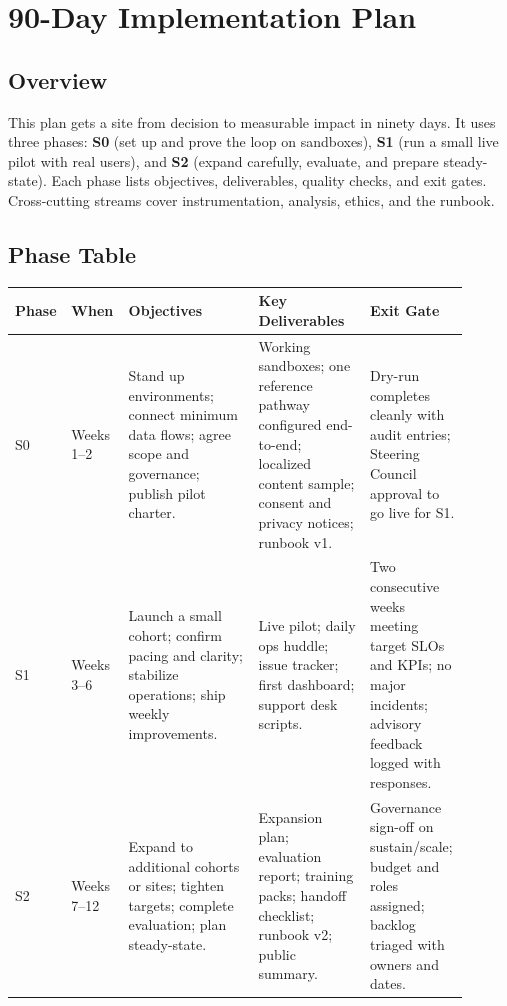 \documentclass[12pt]{article}
\begin{document}
\section{90-Day Implementation Plan}

\subsection*{Overview}
This plan gets a site from decision to measurable impact in ninety days. It uses three phases: \textbf{S0} (set up and prove the loop on sandboxes), \textbf{S1} (run a small live pilot with real users), and \textbf{S2} (expand carefully, evaluate, and prepare steady-state). Each phase lists objectives, deliverables, quality checks, and exit gates. Cross-cutting streams cover instrumentation, analysis, ethics, and the runbook.

\subsection*{Phase Table}
\begin{longtable}{@{}p{0.08\linewidth}p{0.12\linewidth}p{0.28\linewidth}p{0.24\linewidth}p{0.18\linewidth}@{}}
\toprule
\textbf{Phase} & \textbf{When} & \textbf{Objectives} & \textbf{Key Deliverables} & \textbf{Exit Gate} \\
\midrule
\endhead
S0 & Weeks 1--2 & Stand up environments; connect minimum data flows; agree scope and governance; publish pilot charter. & Working sandboxes; one reference pathway configured end-to-end; localized content sample; consent and privacy notices; runbook v1. & Dry-run completes cleanly with audit entries; Steering Council approval to go live for S1. \\
S1 & Weeks 3--6 & Launch a small cohort; confirm pacing and clarity; stabilize operations; ship weekly improvements. & Live pilot; daily ops huddle; issue tracker; first dashboard; support desk scripts. & Two consecutive weeks meeting target SLOs and KPIs; no major incidents; advisory feedback logged with responses. \\
S2 & Weeks 7--12 & Expand to additional cohorts or sites; tighten targets; complete evaluation; plan steady-state. & Expansion plan; evaluation report; training packs; handoff checklist; runbook v2; public summary. & Governance sign-off on sustain/scale; budget and roles assigned; backlog triaged with owners and dates. \\
\bottomrule
\end{longtable}
\end{document}
